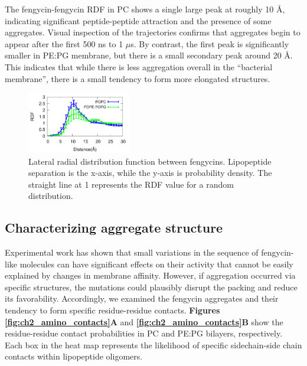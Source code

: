 The fengycin-fengycin RDF in PC shows a single large peak at roughly 10 {\AA},
indicating significant peptide-peptide attraction and the presence of some
aggregates. Visual inspection of the trajectories confirms that aggregates
begin to appear after the first 500 ns to 1 $\mu$s. By contrast, the first peak
is significantly smaller in PE:PG membrane, but there is a small secondary peak
around 20 {\AA.} This indicates that while there is less aggregation overall in
the ``bacterial membrane'', there is a small tendency to form more elongated
structures.

\begin{figure}
\centering
\includegraphics[width=0.4\textwidth]{chapter2_figs/feng_feng.pdf}
\caption{\label{fig:ch2_feng_feng} Lateral radial distribution function between
fengycins. Lipopeptide separation is the x-axis, while  the y-axis is
probability density. The straight line at 1 represents the RDF value for a
random distribution. }
\end{figure}

\subsection{Characterizing aggregate structure}
\label{subsec:aminocontacts}
Experimental work has shown that small variations in the sequence of
fengycin-like molecules can have significant effects on their activity that
cannot be easily explained by changes in membrane
affinity.\cite{Heerklotz2015} However, if aggregation occurred via
specific structures, the mutations could plausibly disrupt the packing and
reduce its favorability. Accordingly, we examined the fengycin aggregates and
their tendency to form specific residue-residue contacts.
\textbf{Figures \ref{fig:ch2_amino_contacts}A} and \textbf{\ref{fig:ch2_amino_contacts}B} show the residue-residue
contact probabilities in PC and PE:PG bilayers, respectively.
Each box in the heat map represents the likelihood of specific sidechain-side
chain contacts within lipopeptide oligomers.

